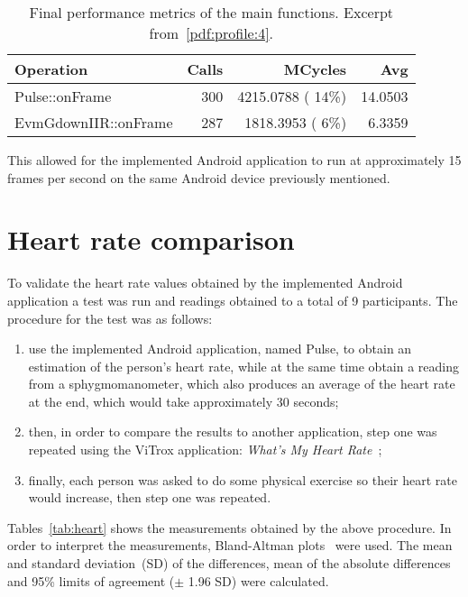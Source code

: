 \begin{table}
  \centering
  \begin{tabular}{lrrr}
    \hline
    Operation & Calls & MCycles & Avg \\
    \hline
    Pulse::onFrame       & 300 & 4215.0788 ( 14\%) & 14.0503 \\
    EvmGdownIIR::onFrame & 287 & 1818.3953 (  6\%) &  6.3359 \\
    \hline
  \end{tabular}
  \caption{
    Final performance metrics of the main functions.
    Excerpt from~\ref{pdf:profile:4}.
  }
  \label{tab:profile:final}
\end{table}

This allowed for the implemented Android application to run at approximately
15 frames per second on the same Android device previously mentioned.

\section{Heart rate comparison} \label{sec:results:heart}

To validate the heart rate values obtained by the implemented Android
application a test was run and readings obtained to a total of 9 participants.
The procedure for the test was as follows:

\begin{enumerate}
  \item use the implemented Android application, named Pulse, to obtain an
        estimation of the person's heart rate, while at the same time
        obtain a reading from a sphygmomanometer, which also produces an
        average of the heart rate at the end, which would take
        approximately 30 seconds;
  \item then, in order to compare the results to another application,
        step one was repeated using the ViTrox application:
        \emph{What's My Heart Rate}~\cite{Vitrox2013};
  \item finally, each person was asked to do some physical exercise so
        their heart rate would increase, then step one was repeated.
\end{enumerate}

Tables~\ref{tab:heart} shows the measurements obtained by the above procedure.
In order to interpret the measurements, Bland-Altman
plots~\cite{Martin1986Statistical} were used.
The mean and standard deviation~(SD) of the differences, mean of the absolute
differences and 95\% limits of agreement ($\pm$ 1.96 SD) were calculated.

